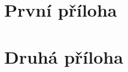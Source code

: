 \documentclass[a4paper,12pt]{article}
\begin{document}

\begin{upconclusions}[czech]
\end{upconclusions}

\begin{upconclusions}[english]
\end{upconclusions}

\upprintbibliography

\upappendix
\section{První příloha}

\section{Druhá příloha}

\upprintindex
\end{document}
